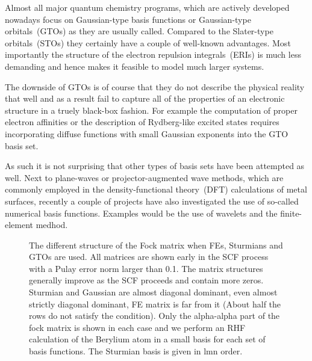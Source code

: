 Almost all major quantum chemistry programs,
which are actively developed nowadays focus on Gaussian-type
basis functions or Gaussian-type orbitals~(GTOs) as they are usually called.
Compared to the Slater-type orbitals~(STOs)
they certainly have a couple of well-known advantages.
Most importantly the structure of the electron repulsion integrals~(ERIs)
is much less demanding and hence makes it feasible to model much larger systems.

The downside of GTOs is of course that they do not describe the physical
reality that well and as a result fail to capture all of the properties
of an electronic structure in a truely black-box fashion.
For example the computation of proper electron affinities or the description
of Rydberg-like excited states requires incorporating diffuse functions
with small Gaussian exponents into the GTO basis set.

As such it is not surprising that other types of basis sets have been attempted as well.
Next to plane-waves or projector-augmented wave methods,
which are commonly employed in the density-functional theory~(DFT)
calculations of metal surfaces,
recently a couple of projects have also investigated the use
of so-called numerical basis functions.
Examples would be the use of wavelets and the finite-element medhod.


\begin{figure}
	\centering
	\caption{The different structure of the Fock matrix when FEs,
		Sturmians and GTOs are used.
		All matrices are shown early in the SCF process with a Pulay error norm
		larger than 0.1.
		The matrix structures generally improve as the SCF proceeds and contain more zeros.
		Sturmian and Gaussian are almost diagonal dominant,
		even almost strictly diagonal dominant,
		FE matrix is far from it (About half the rows do not satisfy the condition).
		Only the alpha-alpha part of the fock matrix is shown in each case
		and we perform an RHF calculation of the Berylium atom in a small basis
		for each set of basis functions.
		The Sturmian basis is given in lmn order.
	}
	\label{fig:FockStructure}
\end{figure}

